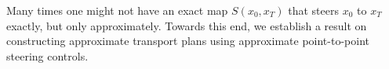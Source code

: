 \documentclass{article}
\newtheorem{theorem}{Theorem}[section]
\newcommand{\Rd}{\mathbb{R}^d}
\newcommand{\R}{\mathbb{R}}
\begin{document}



Many times one might not have an exact map $S(x_0,x_T)$ that steers $x_0$ to $x_T$ exactly, but only approximately. Towards this end, we establish a result on constructing approximate transport plans using approximate point-to-point steering controls.
\end{document}
